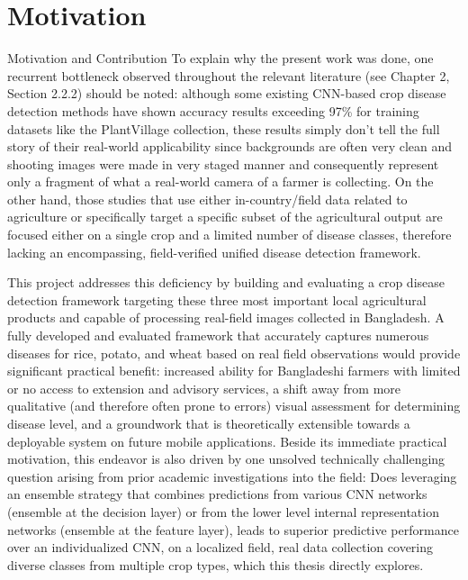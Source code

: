 
\section{Motivation}

Motivation and Contribution To explain why the present work was done, one recurrent bottleneck observed throughout the relevant literature (see Chapter 2, Section 2.2.2) should be noted: although some existing CNN-based crop disease detection methods have shown accuracy results exceeding 97\% for training datasets like the PlantVillage collection, these results simply don’t tell the full story of their real-world applicability since backgrounds are often very clean and shooting images were made in very staged manner and consequently represent only a fragment of what a real-world camera of a farmer is collecting. On the other hand, those studies that use either in-country/field data related to agriculture or specifically target a specific subset of the agricultural output are focused either on a single crop and a limited number of disease classes, therefore lacking an encompassing, field-verified unified disease detection framework.
 
This project addresses this deficiency by building and evaluating a crop disease detection framework targeting these three most important local agricultural products and capable of processing real-field images collected in Bangladesh. A fully developed and evaluated framework that accurately captures numerous diseases for rice, potato, and wheat based on real field observations would provide significant practical benefit: increased ability for Bangladeshi farmers with limited or no access to extension and advisory services, a shift away from more qualitative (and therefore often prone to errors) visual assessment for determining disease level, and a groundwork that is theoretically extensible towards a deployable system on future mobile applications. Beside its immediate practical motivation, this endeavor is also driven by one unsolved technically challenging question arising from prior academic investigations into the field: Does leveraging an ensemble strategy that combines predictions from various CNN networks (ensemble at the decision layer) or from the lower level internal representation networks (ensemble at the feature layer), leads to superior predictive performance over an individualized CNN, on a localized field, real data collection covering diverse classes from multiple crop types, which this thesis directly explores.

